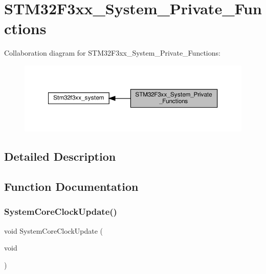 \hypertarget{group__STM32F3xx__System__Private__Functions}{}\section{S\+T\+M32\+F3xx\+\_\+\+System\+\_\+\+Private\+\_\+\+Functions}
\label{group__STM32F3xx__System__Private__Functions}
Collaboration diagram for S\+T\+M32\+F3xx\+\_\+\+System\+\_\+\+Private\+\_\+\+Functions\+:\nopagebreak
\begin{figure}[H]
\begin{center}
\leavevmode
\includegraphics[width=350pt]{group__STM32F3xx__System__Private__Functions}
\end{center}
\end{figure}


\subsection{Detailed Description}


\subsection{Function Documentation}
\mbox{\label{group__STM32F3xx__System__Private__Functions_ga19a0c3ef7421e9045e62d7df7f1120a9}} 
\subsubsection{\texorpdfstring{System\+Core\+Clock\+Update()}{SystemCoreClockUpdate()}}
{\footnotesize\ttfamily void System\+Core\+Clock\+Update (\begin{DoxyParamCaption}\item[{void}]{ }\end{DoxyParamCaption})}



